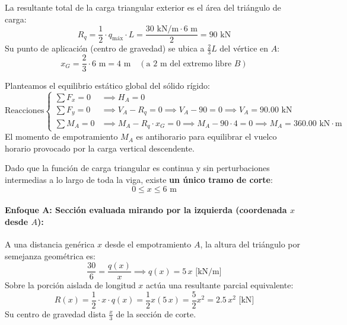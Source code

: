 La resultante total de la carga triangular exterior es el área del triángulo de carga:
\begin{equation}
    R_q = \frac{1}{2} \cdot q_{\text{máx}} \cdot L = \frac{30\text{ kN/m} \cdot 6\text{ m}}{2} = 90\text{ kN}
\end{equation}
Su punto de aplicación (centro de gravedad) se ubica a $\frac{2}{3}L$ del vértice en $A$:
\begin{equation}
    x_G = \frac{2}{3} \cdot 6\text{ m} = 4\text{ m} \quad (\text{a } 2\text{ m del extremo libre } B)
\end{equation}

Planteamos el equilibrio estático global del sólido rígido:
\begin{equation}
    \text{Reacciones} \left\{
    \begin{aligned}
        \sum F_x = 0 & \implies \boxed{H_A = 0}                                                                                            \\[6pt]
        \sum F_y = 0 & \implies V_A - R_q = 0 \implies V_A - 90 = 0 \implies \boxed{V_A = 90.00\text{ kN}}                                 \\[6pt]
        \sum M_A = 0 & \implies M_A - R_q \cdot x_G = 0 \implies M_A - 90 \cdot 4 = 0 \implies \boxed{M_A = 360.00\text{ kN}\cdot\text{m}}
    \end{aligned}
    \right.
\end{equation}
El momento de empotramiento $M_A$ es antihorario para equilibrar el vuelco horario provocado por la carga vertical descendente.


Dado que la función de carga triangular es continua y sin perturbaciones intermedias a lo largo de toda la viga, existe \textbf{un único tramo de corte}:
\begin{equation*}
    0 \le x \le 6\text{ m}
\end{equation*}

\paragraph{Enfoque A: Sección evaluada mirando por la izquierda (coordenada $x$ desde $A$):}

A una distancia genérica $x$ desde el empotramiento $A$, la altura del triángulo por semejanza geométrica es:
\begin{equation}
    \frac{30}{6} = \frac{q(x)}{x} \implies \boxed{q(x) = 5\,x\text{ [kN/m]}}
\end{equation}
Sobre la porción aislada de longitud $x$ actúa una resultante parcial equivalente:
\begin{equation}
    R(x) = \frac{1}{2} \cdot x \cdot q(x) = \frac{1}{2} x (5\,x) = \frac{5}{2}x^2 = 2.5\,x^2\text{ [kN]}
\end{equation}
Su centro de gravedad dista $\frac{x}{3}$ de la sección de corte.

